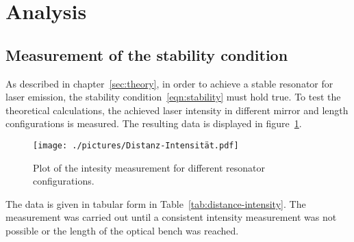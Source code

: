 \section{Analysis}
\subsection{Measurement of the stability condition}
As described in chapter~\ref{sec:theory}, in order to achieve a stable resonator
for laser emission, the stability condition~\ref{eqn:stability} must hold true.
To test the theoretical calculations, the achieved laser intensity in different
mirror and length configurations is measured. The resulting data is displayed in figure~\ref{fig:distance-intesity}.
\begin{figure}[H]
 \centering
 \texttt{[image: ./pictures/Distanz-Intensität.pdf]}
 \caption{Plot of the intesity measurement for different resonator configurations.}
 \label{fig:distance-intesity}
\end{figure}
\noindent
The data is given in tabular form in Table~\ref{tab:distance-intensity}.
The measurement was carried out until a consistent intensity measurement was not possible or the length of the
optical bench was reached.
